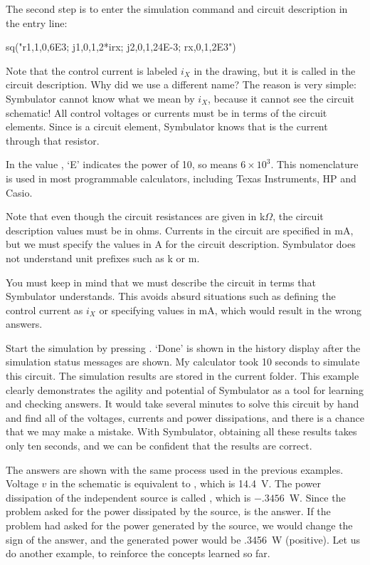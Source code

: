 The second step is to enter the simulation command and circuit
description in the entry line:

\begin{entry}
sq\dc("r1,1,0,6E3; j1,0,1,2*irx; j2,0,1,24E-3; rx,0,1,2E3")
\end{entry}

Note that the control current is labeled $i_X$ in the drawing, but
it is called  in the circuit description. Why did we use a
different name? The reason is very simple: Symbulator cannot know
what we mean by $i_X$, because it cannot see the circuit schematic!
All control voltages or currents must be in terms of the circuit
elements. Since  is a circuit element, Symbulator knows
that  is the current through that resistor.

In the value , `E' indicates the power of 10, so
 means $6 \times 10^{3}$. This nomenclature is used in
most programmable calculators, including Texas Instruments, HP and
Casio.

Note that even though the circuit resistances are given in
k$\Omega$, the circuit description values must be in ohms. Currents
in the circuit are specified in mA, but we must specify the values
in A for the circuit description. Symbulator does not understand
unit prefixes such as k or m.

You must keep in mind that we must describe the circuit in terms
that Symbulator understands. This avoids absurd situations such as
defining the control current as $i_X$ or specifying values in mA,
which would result in the wrong answers.

Start the simulation by pressing . `Done' is shown in the
history display after the simulation status messages are shown. My
calculator took 10 seconds to simulate this circuit. The simulation
results are stored in the current folder. This example clearly
demonstrates the agility and potential of Symbulator as a tool for
learning and checking answers. It would take several minutes to
solve this circuit by hand and find all of the voltages, currents
and power dissipations, and there is a chance that we may make a
mistake. With Symbulator, obtaining all these results takes only ten
seconds, and we can be confident that the results are correct.

The answers are shown with the same process used in the previous
examples. Voltage $v$ in the schematic is equivalent to ,
which is 14.4~V. The power dissipation of the independent source is
called , which is $-.3456$~W. Since the problem asked for
the power dissipated by the source,  is the answer. If the
problem had asked for the power generated by the source, we would
change the sign of the answer, and the generated power would be
.3456~W (positive). Let us do another example, to reinforce the
concepts learned so far.

